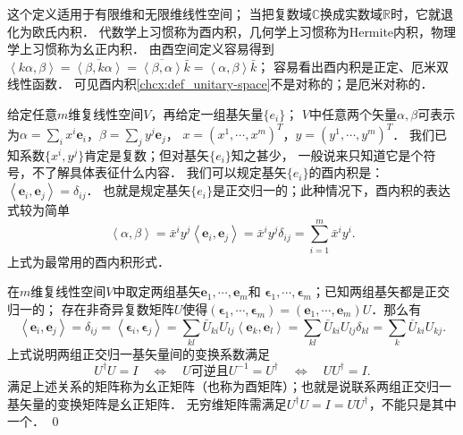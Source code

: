  
 


这个定义适用于有限维和无限维线性空间；
当把复数域$\mathbb{C}$换成实数域$\mathbb{R}$时，它就退化为欧氏内积．
代数学上习惯称为酉内积，几何学上习惯称为Hermite内积，物理学上习惯称为幺正内积．
由酉空间定义容易得到
$\left<k\alpha,\beta\right>=\overline{\left<\beta,k\alpha\right>}
=\overline{\left<\beta,\alpha\right>} \bar{k} = \left<\alpha,\beta\right>\bar{k}$；
容易看出酉内积是正定、厄米双线性函数．
可见酉内积\ref{chcx:def_unitary-space}不是对称的；是厄米对称的．

给定任意$m$维复线性空间$V$，再给定一组基矢量$\{{e}_i\}$；
$V$中任意两个矢量$\alpha,\beta$可表示
为$\alpha=\sum_i x^i \boldsymbol{e}_i$，$\beta=\sum_j y^j \boldsymbol{e}_j$，
$x=(x^1,\cdots,x^m)^T$，$y=(y^1,\cdots,y^m)^T$．
我们已知系数$\{x^i,y^j\}$肯定是复数；但对基矢$\{{e}_i\}$知之甚少，
一般说来只知道它是个符号，不了解具体表征什么内容．
我们可以规定基矢$\{{e}_i\}$的酉内积是：
$    \left<\boldsymbol{e}_i,\boldsymbol{e}_j\right> = \delta_{ij}$．
也就是规定基矢$\{{e}_i\}$是正交归一的；此种情况下，酉内积的表达式较为简单
\begin{equation}\label{chcx:eqn_Hermite-Product}
    \left<\alpha,\beta\right>=\bar{x}^i y^j \left<\boldsymbol{e}_i,\boldsymbol{e}_j\right>
     =\bar{x}^i y^j \delta_{ij} = \sum_{i=1}^{m}\bar{x}^i y^i.
\end{equation}
上式为最常用的酉内积形式．

\begin{example}
    在$m$维复线性空间$V$中取定两组基矢$\boldsymbol{e}_1,\cdots,\boldsymbol{e}_m$和
   $\boldsymbol{\epsilon}_1,\cdots,\boldsymbol{\epsilon}_m$；已知两组基矢都是正交归一的；
   存在非奇异复数矩阵$U$使得$(\boldsymbol{\epsilon}_1,\cdots,\boldsymbol{\epsilon}_m)
   =(\boldsymbol{e}_1,\cdots,\boldsymbol{e}_m)U$．那么有
   \begin{equation*}
       \left<\boldsymbol{e}_i,\boldsymbol{e}_j\right> = \delta_{ij} 
       =\left<\boldsymbol{\epsilon}_i,\boldsymbol{\epsilon}_j\right> 
       =\sum_{kl}\bar{U}_{ki} U_{lj}\left<\boldsymbol{e}_k,\boldsymbol{e}_l\right>
       =\sum_{kl}\bar{U}_{ki} U_{lj}\delta_{kl}
       =\sum_{k}\bar{U}_{ki} U_{kj} .
   \end{equation*}
   上式说明两组正交归一基矢量间的变换系数满足
   \begin{equation}
       U^\dagger U = I \quad \Leftrightarrow\quad
       U \text {可逆且} U^{-1} = U^\dagger \quad \Leftrightarrow\quad
       U U^\dagger = I .
   \end{equation}
   满足上述关系的矩阵称为{\heiti 幺正矩阵}（也称为酉矩阵）；也就是说联系两组正交归一
   基矢量的变换矩阵是幺正矩阵．
   无穷维矩阵需满足$U^\dagger U = I=U U^\dagger$，不能只是其中一个．
   \qed
\end{example}


